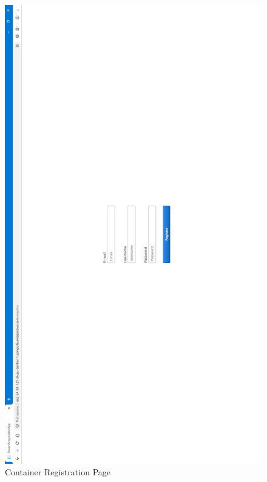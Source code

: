 \begin{figure}[p]
	\centering
	\noindent
	\includegraphics[width=0.5\paperwidth]{./images/guide/container/register.PNG}
	\caption{Container Registration Page}
	\label{fig:containerRegister}
\end{figure}

